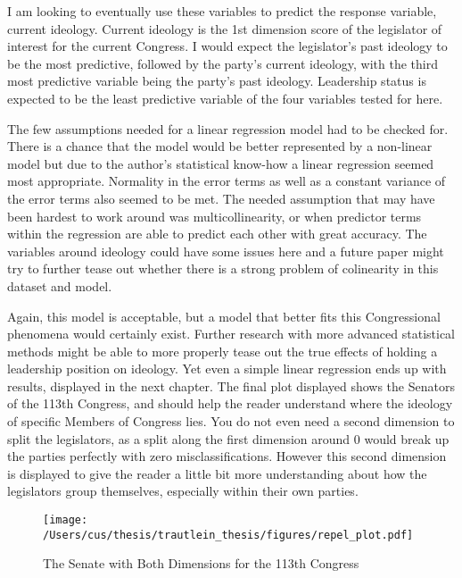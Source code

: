 \documentclass[12pt,twoside]{reedthesis}
\begin{document}
  I am looking to eventually use these variables to predict the response
  variable, current ideology. Current ideology is the 1st dimension score
  of the legislator of interest for the current Congress. I would expect
  the legislator's past ideology to be the most predictive, followed by
  the party's current ideology, with the third most predictive variable
  being the party's past ideology. Leadership status is expected to be the
  least predictive variable of the four variables tested for here.
  
  The few assumptions needed for a linear regression model had to be
  checked for. There is a chance that the model would be better
  represented by a non-linear model but due to the author's statistical
  know-how a linear regression seemed most appropriate. Normality in the
  error terms as well as a constant variance of the error terms also
  seemed to be met. The needed assumption that may have been hardest to
  work around was multicollinearity, or when predictor terms within the
  regression are able to predict each other with great accuracy. The
  variables around ideology could have some issues here and a future paper
  might try to further tease out whether there is a strong problem of
  colinearity in this dataset and model.
  
  Again, this model is acceptable, but a model that better fits this
  Congressional phenomena would certainly exist. Further research with
  more advanced statistical methods might be able to more properly tease
  out the true effects of holding a leadership position on ideology. Yet
  even a simple linear regression ends up with results, displayed in the
  next chapter. The final plot displayed shows the Senators of the 113th
  Congress, and should help the reader understand where the ideology of
  specific Members of Congress lies. You do not even need a second
  dimension to split the legislators, as a split along the first dimension
  around 0 would break up the parties perfectly with zero
  misclassifications. However this second dimension is displayed to give
  the reader a little bit more understanding about how the legislators
  group themselves, especially within their own parties.
  
  \begin{figure}[h!tbp]
  \centering
  \texttt{[image: /Users/cus/thesis/trautlein\_thesis/figures/repel\_plot.pdf]}
  \caption[The Senate with Both Dimensions for the 113th Congress]{\normalsize{The Senate with Both Dimensions for the 113th Congress}}
  \label{fig:def}
  \end{figure}
  
\end{document}
